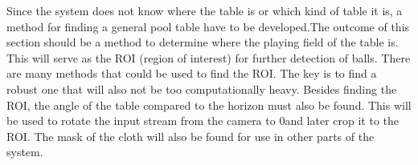 Since the system does not know where the table is or which kind of table it is, a method for finding a general pool table have to be developed.The outcome of this section should be a method to determine where the playing field of the table is. This will serve as the ROI (region of interest) for further detection of balls. There are many methods that could be used to find the ROI. The key is to find a robust one that will also not be too computationally heavy. Besides finding the ROI, the angle of the table compared to the horizon must also be found. This will be used to rotate the input stream from the camera to 0\degree and later crop it to the ROI. The mask of the cloth will also be found for use in other parts of the system.\\
